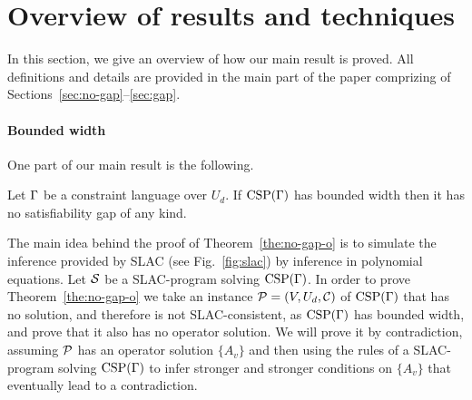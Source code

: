 \documentclass[11pt,letter]{article}
\begin{document}
 
 

\section{Overview of results and techniques}

In this section, we give an overview of how our main result is proved. All
definitions and details are provided in the main part of the paper comprizing of
Sections~\ref{sec:no-gap}--\ref{sec:gap}.

\paragraph{Bounded width}

One part of our main result is the following.

\begin{theorem}\label{the:no-gap-o}
Let $\Gamma$ be a constraint language over $U_d$. If ${\rm CSP}(\Gamma)$ has bounded
width then it has no satisfiability gap of any kind.
\end{theorem}

The main idea behind the proof of Theorem~\ref{the:no-gap-o} 
is to simulate the inference provided by SLAC (see Fig.~\ref{fig:slac}) 
by inference in polynomial equations. Let ${\mathcal S}$ be a SLAC-program solving ${\rm CSP}(\Gamma)$.
In order to prove Theorem~\ref{the:no-gap-o} we take an instance ${\mathcal P}=(V,U_d,{\mathcal C})$ of ${\rm CSP}(\Gamma)$ that has no solution, and therefore  is not SLAC-consistent, as ${\rm CSP}(\Gamma)$ has bounded width, and prove that it also has no operator solution. We will prove it by contradiction, assuming ${\mathcal P}$ has an operator solution $\{A_v\}$ and then using the rules of a SLAC-program solving ${\rm CSP}(\Gamma)$ to infer stronger and stronger conditions on $\{A_v\}$ that eventually lead to a contradiction. 
\end{document}
